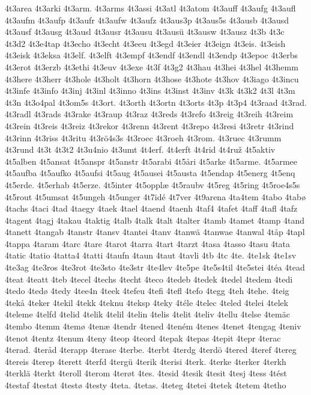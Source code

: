 4t3area
4t3arki
4t3arm.
4t3arms
4t3assi
4t3atl
4t3atom
4t3auff
4t3aufg
4t3aufl
4t3aufm
4t3aufp
4t3aufr
4t3aufw
4t3aufz
4t3aus3p
4t3aus5s
4t3ausb
4t3ausd
4t3ausf
4t3ausg
4t3ausl
4t3ausr
4t3ausu
4t3ausü
4t3ausw
4t3ausz
4t3b
4t3c
4t3d2
4t3e4tap
4t3echo
4t3echt
4t3eeu
4t3egd
4t3eier
4t3eign
4t3eis.
4t3eish
4t3eisk
4t3eksa
4t3elf.
4t3elft
4t3empf
4t3endf
4t3endl
4t3endp
4t3epoc
4t3erbs
4t3erot
4t3erzb
4t3ethi
4t3euv
4t3exe
4t3f
4t3g2
4t3hau
4t3hei
4t3hel
4t3hemm
4t3here
4t3herr
4t3hole
4t3holt
4t3horn
4t3hose
4t3hote
4t3hov
4t3iago
4t3incu
4t3infe
4t3info
4t3inj
4t3inl
4t3inno
4t3ins
4t3inst
4t3inv
4t3k
4t3k2
4t3l
4t3m
4t3n
4t3o4pal
4t3om5s
4t3ort.
4t3orth
4t3ortn
4t3orts
4t3p
4t3p4
4t3raad
4t3rad.
4t3radl
4t3rads
4t3rake
4t3raup
4t3raz
4t3reds
4t3refo
4t3reig
4t3reih
4t3reim
4t3rein
4t3reis
4t3reiz
4t3rekor
4t3renn
4t3rent
4t3repo
4t3resi
4t3retr
4t3rind
4t3rinn
4t3riss
4t3ritu
4t3rö4s3s
4t3roec
4t3roeh
4t3rom.
4t3ruec
4t3rumm
4t3rund
4t3t
4t3t2
4t3u4nio
4t3umt
4t4erf.
4t4erft
4t4rid
4t4ruž
4t5aktiv
4t5alben
4t5ansat
4t5anspr
4t5anstr
4t5arabi
4t5åri
4t5arke
4t5arme.
4t5armee
4t5aufba
4t5aufko
4t5aufsi
4t5aug
4t5ausei
4t5austa
4t5endap
4t5energ
4t5enq
4t5erde.
4t5erhab
4t5erze.
4t5inter
4t5opplæ
4t5raubv
4t5reg
4t5ring
4t5roe4s5s
4t5rout
4t5umsat
4t5ungeh
4t5unger
4t7idé
4t7ver
4t9arena
4ta4tem
4tabo
4tabø
4tachs
4taci
4tad
4taegy
4taek
4tael
4taend
4taenh
4taf4
4tafet
4taff
4tafl
4tafz
4tagent
4tagj
4takau
4taktig
4talb
4talk
4talt
4talter
4tamb
4tamet
4tamp
4tand
4tanett
4tangab
4tanstr
4tansv
4tantei
4tanv
4tanwä
4tanwae
4tanwal
4tåp
4tapl
4tappa
4taram
4tarc
4tare
4tarot
4tarra
4tart
4tarzt
4tasa
4tasso
4tasu
4tata
4tatic
4tatio
4tatta4
4tatti
4taufn
4taun
4taut
4tavli
4tb
4tc
4te.
4te1sk
4te1sv
4te3ag
4te3ros
4te3rot
4te3sto
4te3str
4te4lev
4te5pe
4te5s4til
4te5stei
4téa
4tead
4teat
4teatt
4teb
4tecel
4techs
4techt
4teco
4tedeb
4tedek
4tedel
4tedem
4tedi
4tedo
4tedø
4tedy
4tee4n
4teek
4tefeu
4tefi
4tefl
4tefo
4tegg
4teh
4tehe.
4teig
4tekå
4teker
4tekil
4tekk
4teknu
4teksp
4teky
4téle
4telec
4teled
4telei
4telek
4teleme
4telfd
4telid
4telik
4telil
4telin
4telis
4telit
4teliv
4tellu
4telse
4temäc
4tembo
4temm
4temø
4tenæ
4tendr
4tened
4teném
4tenes
4tenet
4tengag
4teniv
4tenot
4tentz
4tenum
4teny
4teop
4teord
4tepak
4tepas
4tepit
4tepr
4terac
4terad.
4teråd
4terapp
4terase
4terbe.
4terbt
4terdg
4terdö
4tered
4teref
4tereg
4tereis
4terep
4terett
4terfd
4tergü
4terik
4terisi
4terk.
4terke
4terker
4terkh
4terklä
4terkt
4teroll
4terom
4terøt
4tes.
4tesid
4tesik
4tesit
4tesj
4tess
4tést
4testaf
4testat
4testø
4testy
4teta.
4tetas.
4teteg
4tetei
4tetek
4tetem
4tetho
